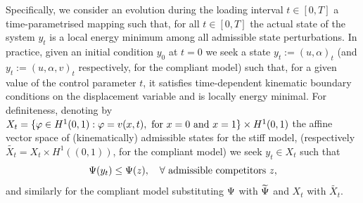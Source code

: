 Specifically, we consider an evolution during the loading interval $t\in [0, T]$ a time-parametrised mapping such that, for all $t\in [0, T]$ the actual state of the system $y_t$ is a local energy minimum among all admissible state perturbations. %
In practice, given an initial condition $y_0$ at $t=0$ we seek a state $y_t:=(u, \alpha)_t$ (and $y_t:=(u, \alpha, v)_t$ respectively, for the compliant model) such that, for a given value of the control parameter $t$, it satisfies time-dependent kinematic boundary conditions on the displacement variable and is locally energy minimal. 
For definiteness, denoting by $X_t = \{\varphi\in H^1(0, 1):\varphi=v(x, t),\text{ for } x=0\text{ and } x=1\}\times H^1(0,1)$ the affine vector space of (kinematically) admissible states for the stiff model, (respectively $\widetilde{X_t} = X_t\times H^1((0, 1))$, for the compliant model) 
we seek $y_t\in X_t$ such that
\begin{equation}
    \label{eq:variational_global_ineq}
    \Psi(y_t) \leq \Psi(z),\quad \forall \text{ admissible competitors } z,
\end{equation}
and similarly for the compliant model substituting $\Psi$ with $\widetilde\Psi$ and $X_t$ with $\widetilde{X_t}$.
